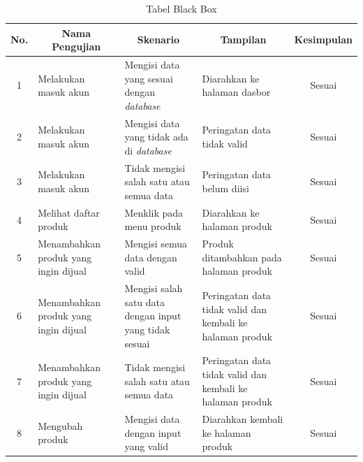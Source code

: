 \begin{longtable}{| m{0.5cm} | m{3.2cm} | m{3.4cm} | m{3.3cm} | m{1.6cm} |}
	\caption{Tabel Black Box}
	\label{tab:black box}\\
	\hline
	{\footnotesize No.} & \multicolumn{1}{|c|}{{\footnotesize Nama Pengujian}}  & \multicolumn{1}{|c|}{{\footnotesize Skenario}} & \multicolumn{1}{|c|}{{\footnotesize Tampilan}} & {\footnotesize Kesimpulan}\\
	\hline
	\multicolumn{1}{|c|}{{\footnotesize 1}} & {\footnotesize Melakukan masuk akun} & {\footnotesize Mengisi data yang sesuai dengan \textit{database}} & {\footnotesize Diarahkan ke halaman dasbor} & \multicolumn{1}{|c|}{{\footnotesize Sesuai}}\\
	\hline
	\multicolumn{1}{|c|}{{\footnotesize 2}} & {\footnotesize Melakukan masuk akun} & {\footnotesize Mengisi data yang tidak ada di \textit{database}} & {\footnotesize Peringatan data tidak valid} & \multicolumn{1}{|c|}{{\footnotesize Sesuai}}\\
	\hline
	\multicolumn{1}{|c|}{{\footnotesize 3}} & {\footnotesize Melakukan masuk akun} & {\footnotesize Tidak mengisi salah satu atau semua data} & {\footnotesize Peringatan data belum diisi} & \multicolumn{1}{|c|}{{\footnotesize Sesuai}}\\
	\hline
	\multicolumn{1}{|c|}{{\footnotesize 4}} & {\footnotesize Melihat daftar produk} & {\footnotesize Menklik pada menu produk} & {\footnotesize Diarahkan ke halaman produk} & \multicolumn{1}{|c|}{{\footnotesize Sesuai}}\\
	\hline
	\multicolumn{1}{|c|}{{\footnotesize 5}} & {\footnotesize Menambahkan produk yang ingin dijual} & {\footnotesize Mengisi semua data dengan valid} & {\footnotesize Produk ditambahkan pada halaman produk} & \multicolumn{1}{|c|}{{\footnotesize Sesuai}}\\
	\hline
	\multicolumn{1}{|c|}{{\footnotesize 6}} & {\footnotesize Menambahkan produk yang ingin dijual} & {\footnotesize Mengisi salah satu data dengan input yang tidak sesuai} & {\footnotesize Peringatan data tidak valid dan kembali ke halaman produk} & \multicolumn{1}{|c|}{{\footnotesize Sesuai}}\\
	\hline
	\multicolumn{1}{|c|}{{\footnotesize 7}} & {\footnotesize Menambahkan produk yang ingin dijual} & {\footnotesize Tidak mengisi salah satu atau semua data} & {\footnotesize Peringatan data tidak valid dan kembali ke halaman produk} & \multicolumn{1}{|c|}{{\footnotesize Sesuai}}\\
	\hline
	\multicolumn{1}{|c|}{{\footnotesize 8}} & {\footnotesize Mengubah produk} & {\footnotesize Mengisi data dengan input yang valid} & {\footnotesize Diarahkan kembali ke halaman produk} & \multicolumn{1}{|c|}{{\footnotesize Sesuai}}\\

\end{longtable}
